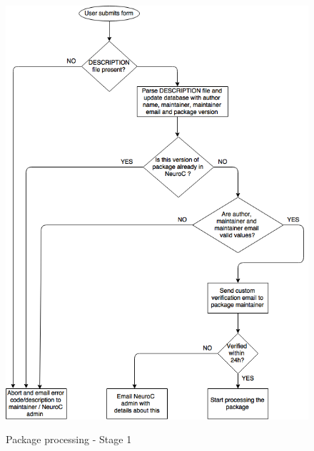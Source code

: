 \documentclass[]{elsarticle} %
\begin{document}
\begin{figure}[!ht]
  \begin{center}
    \caption{Package processing - Stage 1}
    \label{fig:stage1}
    \includegraphics[height=\textheight]{flow_stage1_draft.png}\label{fig:package_lifetime_1}
  \end{center}
\end{figure}
\end{document}
